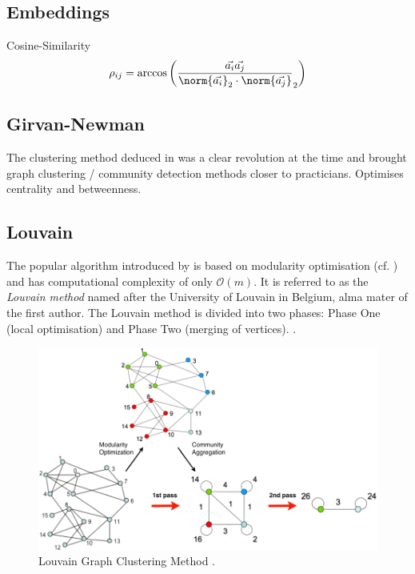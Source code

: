 \documentclass[12pt, a4paper]{article}
\begin{document}
  \subsection{Embeddings}
  Cosine-Similarity
  $$\rho_{ij} = \arccos\left(\frac{\vec{a_i} \vec{a_j}}{\norm{\vec{a_i}}_2 \cdot \norm{\vec{a_j}}}_2\right)$$

  \subsection{Girvan-Newman}
  The clustering method deduced in \cite{girvan-newman} was a clear revolution at the time and brought graph clustering / community detection methods closer to practicians.
  Optimises centrality and betweenness.

  \subsection{Louvain}
  The popular algorithm introduced by \cite{lambiotte-louvain-clustering} is based on modularity optimisation (cf. ) and has computational complexity of only $\mathcal{O}(m)$.
  It is referred to as the \textit{Louvain method} named after the University of Louvain in Belgium, alma mater of the first author.
  The Louvain method is divided into two phases: Phase One (local optimisation) and Phase Two (merging of vertices).
  \cite{grindrod-lecture-notes}.

  \begin{figure}[H]
    \centering
    \includegraphics[width=\linewidth]{figures/blondel.png}
    \caption{Louvain Graph Clustering Method \cite{lambiotte-louvain-clustering}.}
  \end{figure}
\end{document}
